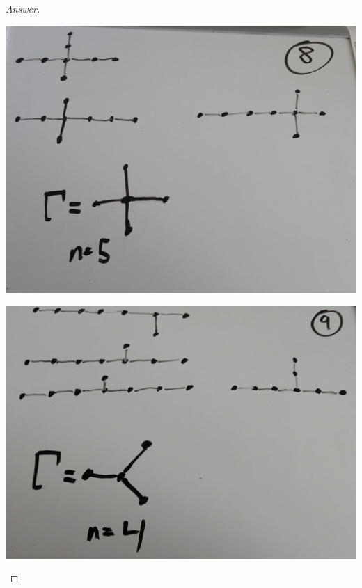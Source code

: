 \documentclass[12pt]{article}
\begin{document}
\begin{proof}[Answer]
\begin{center}
\hspace{0.05in}
\includegraphics[scale=0.07]{8.jpg}
\end{center}
\begin{center}
\includegraphics[scale=0.07]{9.jpg}
\hspace{0.05in}

\end{center}
\end{proof}
\end{document}
